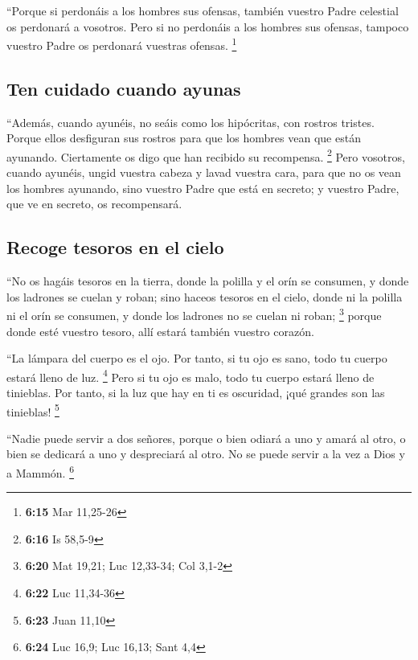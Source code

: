  ``Porque si perdonáis a los hombres sus ofensas, también
vuestro Padre celestial os perdonará a vosotros.  Pero si
no perdonáis a los hombres sus ofensas, tampoco vuestro Padre os
perdonará vuestras ofensas. \footnote{\textbf{6:15} Mar 11,25-26}

\hypertarget{ten-cuidado-cuando-ayunas}{%
\subsection{Ten cuidado cuando ayunas}\label{ten-cuidado-cuando-ayunas}}

 ``Además, cuando ayunéis, no seáis como los hipócritas,
con rostros tristes. Porque ellos desfiguran sus rostros para que los
hombres vean que están ayunando. Ciertamente os digo que han recibido su
recompensa. \footnote{\textbf{6:16} Is 58,5-9}  Pero
vosotros, cuando ayunéis, ungid vuestra cabeza y lavad vuestra cara,
 para que no os vean los hombres ayunando, sino vuestro
Padre que está en secreto; y vuestro Padre, que ve en secreto, os
recompensará.

\hypertarget{recoge-tesoros-en-el-cielo}{%
\subsection{Recoge tesoros en el
cielo}\label{recoge-tesoros-en-el-cielo}}

 ``No os hagáis tesoros en la tierra, donde la polilla y
el orín se consumen, y donde los ladrones se cuelan y roban;
 sino haceos tesoros en el cielo, donde ni la polilla ni
el orín se consumen, y donde los ladrones no se cuelan ni roban;
\footnote{\textbf{6:20} Mat 19,21; Luc 12,33-34; Col 3,1-2}
 porque donde esté vuestro tesoro, allí estará también
vuestro corazón.

 ``La lámpara del cuerpo es el ojo. Por tanto, si tu ojo
es sano, todo tu cuerpo estará lleno de luz. \footnote{\textbf{6:22} Luc
  11,34-36}  Pero si tu ojo es malo, todo tu cuerpo
estará lleno de tinieblas. Por tanto, si la luz que hay en ti es
oscuridad, ¡qué grandes son las tinieblas! \footnote{\textbf{6:23} Juan
  11,10}

 ``Nadie puede servir a dos señores, porque o bien odiará
a uno y amará al otro, o bien se dedicará a uno y despreciará al otro.
No se puede servir a la vez a Dios y a Mammón. \footnote{\textbf{6:24}
  Luc 16,9; Luc 16,13; Sant 4,4}

